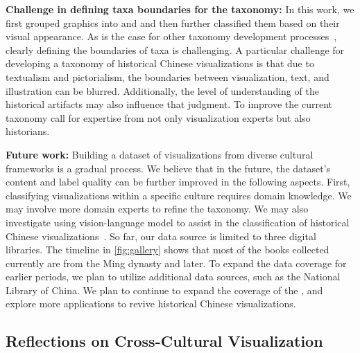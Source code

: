 \textbf{Challenge in defining taxa boundaries for the taxonomy:}
In this work, we first grouped graphics into  and  and then further classified them based on their visual appearance.
As is the case for other taxonomy development processes~\cite{Chen2024Image}, clearly defining the boundaries of taxa is challenging.
A particular challenge for developing a taxonomy of historical Chinese visualizations is that due to textualism and pictorialism, the boundaries between visualization, text, and illustration can be blurred.
Additionally, the level of understanding of the historical artifacts may also influence that judgment.
To improve the current taxonomy call for expertise from not only visualization experts but also historians.





\textbf{Future work:}
Building a dataset of visualizations from diverse cultural frameworks is a gradual process. 
We believe that in the future, the dataset's content and label quality can be further improved in the following aspects.
First, classifying visualizations within a specific culture requires domain knowledge.
We may involve more domain experts to refine the taxonomy.
We may also investigate using vision-language model to assist in the classification of historical Chinese visualizations~\cite{Springstein2024Visual}.
So far, our data source is limited to three digital libraries.
The timeline in \cref{fig:gallery} shows that most of the books collected currently are from the Ming dynasty and later.
To expand the data coverage for earlier periods, we plan to utilize additional data sources, such as the National Library of China.
We plan to continue to expand the coverage of the \datasetName, and explore more applications to revive historical Chinese visualizations.

\subsection{Reflections on Cross-Cultural Visualization}
\label{sec:discuss-convention}

